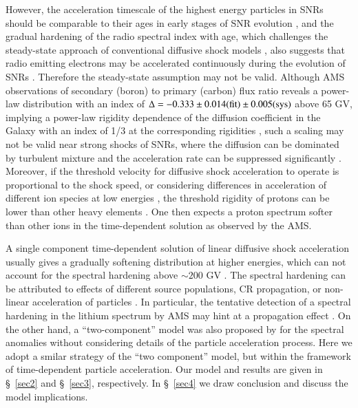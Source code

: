 \documentclass[apj]{emulateapj}
\begin{document}
However, the acceleration timescale of the highest energy particles in SNRs should be comparable to their ages in early stages of SNR evolution \citep{Helder2012}, and the gradual hardening of the radio spectral index with age, which challenges the steady-state approach of conventional diffusive shock models \citep{Reynolds2012}, also suggests that radio emitting electrons may be accelerated continuously during the evolution of SNRs \citep{2017ApJ...834..153Z}. Therefore the steady-state assumption may not be valid. Although AMS observations of secondary (boron) to primary (carbon) flux ratio reveals a power-law distribution with an index of $ \Delta =-0.333\pm 0.014(\rm fit)\pm 0.005(\rm sys) $ above 65 GV, implying a power-law rigidity dependence of the diffusion coefficient in the Galaxy with an index of 1/3 at the corresponding rigidities \citep{2016PhRvL.117w1102A}, such a scaling may not be valid near strong shocks of SNRs, where the diffusion can be dominated by turbulent mixture \citep{1993PhyU...36.1020B} and the acceleration rate can be suppressed significantly \citep{2010MNRAS.406.1337F, 2016arXiv161202262Y, 2016arXiv160908671H}. Moreover, if the threshold velocity for diffusive shock acceleration to operate is proportional to the shock speed, or considering differences in  acceleration of different ion species at low energies \citep{2004ApJ...610..550P}, the threshold rigidity of protons can be lower than other heavy elements \citep{2010ApJ...708..965Z}. One then expects a proton spectrum softer than other ions in the time-dependent solution as observed by the AMS.

A single component time-dependent solution of linear diffusive shock acceleration usually gives a gradually softening distribution at higher energies, which can not account for the spectral hardening above $\sim 200$ GV \citep[however, see][for an alternative]{Khialietal17}. The spectral hardening can be attributed to effects of different source populations, CR propagation, or non-linear acceleration of particles \citep{2012ApJ...752...68V, Ohira16}. In particular, the tentative detection of a spectral hardening in the lithium spectrum by AMS may hint at a propagation effect \citep{2012PhRvL.109f1101B}. On the other hand, a ``two-component'' model was also proposed by \citet{2015ApJ...815L...1T} for the spectral anomalies without considering details of the particle acceleration process. Here we adopt a smilar strategy of the ``two component'' model, but within the framework of time-dependent particle acceleration. Our model and results are given in \S\ \ref{sec2} and \S\ \ref{sec3}, respectively. In \S\ \ref{sec4} we draw conclusion and discuss the model implications.
\end{document}
